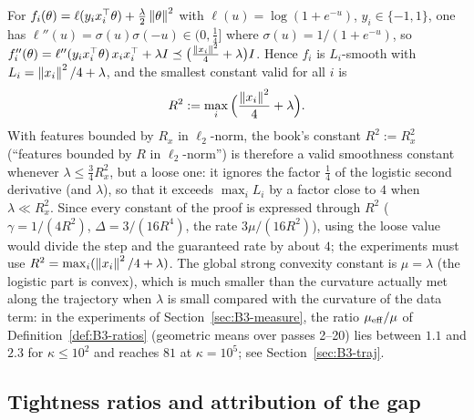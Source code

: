 \begin{remark}\label{rem:B3-R2}
For $f_i(\theta)=\ell(y_ix_i^\top\theta)+\frac\lambda2\left\|\theta\right\|^2$ with $\ell(u)=\log(1+e^{-u})$, $y_i\in\{-1,1\}$, one has $\ell''(u)=\sigma(u)\sigma(-u)\in(0,\frac14]$ where $\sigma(u)=1/(1+e^{-u})$, so $f_i''(\theta)=\ell''(y_ix_i^\top\theta)\,x_ix_i^\top+\lambda I\preceq\big(\frac{\left\|x_i\right\|^2}{4}+\lambda\big)I$. Hence $f_i$ is $L_i$-smooth with $L_i=\left\|x_i\right\|^2/4+\lambda$, and the smallest constant valid for all $i$ is
\[
R^2:=\max_{i}\Big(\frac{\left\|x_i\right\|^2}{4}+\lambda\Big).
\]
With features bounded by $R_x$ in $\ell_2$-norm, the book's constant $R^2:=R_x^2$ (``features bounded by $R$ in $\ell_2$-norm'') is therefore a valid smoothness constant whenever $\lambda\le\frac34R_x^2$, but a loose one: it ignores the factor $\frac14$ of the logistic second derivative (and $\lambda$), so that it exceeds $\max_iL_i$ by a factor close to $4$ when $\lambda\ll R_x^2$. Since every constant of the proof is expressed through $R^2$ ($\gamma=1/(4R^2)$, $\Delta=3/(16R^4)$, the rate $3\mu/(16R^2)$), using the loose value would divide the step and the guaranteed rate by about $4$; the experiments must use $R^2=\max_i(\left\|x_i\right\|^2/4+\lambda)$. The global strong convexity constant is $\mu=\lambda$ (the logistic part is convex), which is much smaller than the curvature actually met along the trajectory when $\lambda$ is small compared with the curvature of the data term: in the experiments of Section~\ref{sec:B3-measure}, the ratio $\mu_{\mathrm{eff}}/\mu$ of Definition~\ref{def:B3-ratios} (geometric means over passes 2--20) lies between $1.1$ and $2.3$ for $\kappa\le10^2$ and reaches $81$ at $\kappa=10^5$; see Section~\ref{sec:B3-traj}.
\end{remark}

\subsection{Tightness ratios and attribution of the gap}\label{sec:B3-ratios}

